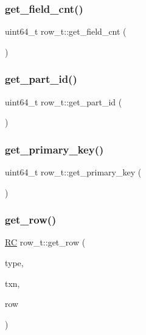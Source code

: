\subsubsection{\texorpdfstring{get\+\_\+field\+\_\+cnt()}{get\_field\_cnt()}}
{\footnotesize\ttfamily uint64\+\_\+t row\+\_\+t\+::get\+\_\+field\+\_\+cnt (\begin{DoxyParamCaption}{ }\end{DoxyParamCaption})}

\mbox{\label{classrow__t_ae6702cc7db6b72bf3082415bee9b3e9e}} 
\subsubsection{\texorpdfstring{get\+\_\+part\+\_\+id()}{get\_part\_id()}}
{\footnotesize\ttfamily uint64\+\_\+t row\+\_\+t\+::get\+\_\+part\+\_\+id (\begin{DoxyParamCaption}{ }\end{DoxyParamCaption})\hspace{0.3cm}{\ttfamily [inline]}}

\mbox{\label{classrow__t_a7e11cd7d6a95f897438073120eb68cff}} 
\subsubsection{\texorpdfstring{get\+\_\+primary\+\_\+key()}{get\_primary\_key()}}
{\footnotesize\ttfamily uint64\+\_\+t row\+\_\+t\+::get\+\_\+primary\+\_\+key (\begin{DoxyParamCaption}{ }\end{DoxyParamCaption})\hspace{0.3cm}{\ttfamily [inline]}}

\mbox{\label{classrow__t_a49ff4bc52abd5712d2f0a8b9eef5e2bb}} 
\subsubsection{\texorpdfstring{get\+\_\+row()}{get\_row()}}
{\footnotesize\ttfamily \hyperlink{global_8h_a78c49a674c810fdd03d20432f7be864a}{RC} row\+\_\+t\+::get\+\_\+row (\begin{DoxyParamCaption}\item[{\hyperlink{global_8h_a567f81b0ae33b00d189d7714e9fde0bc}{access\+\_\+t}}]{type,  }\item[{\hyperlink{classtxn__man}{txn\+\_\+man} $\ast$}]{txn,  }\item[{\hyperlink{classrow__t}{row\+\_\+t} $\ast$\&}]{row }\end{DoxyParamCaption})}

